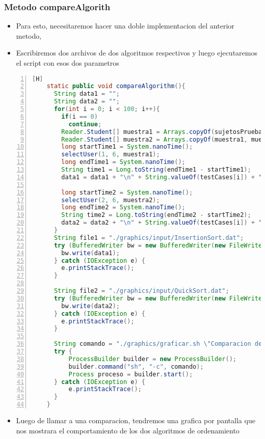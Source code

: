 \subsubsection{Metodo compareAlgorith}
\begin{itemize}
  \item Para esto, necesitaremos hacer una doble implementacion del anterior metodo,
  \item Escribiremos dos archivos de dos algoritmos respectivos y luego ejecutaremos el script con esos dos parametros

\end{itemize}
\begin{lstlisting}[language=java, caption={Testear algoritmo}, numbers=left, firstnumber=1][H]
    static public void compareAlgorithm(){
      String data1 = "";
      String data2 = "";
      for(int i = 0; i < 100; i++){
        if(i == 0)
          continue;
        Reader.Student[] muestra1 = Arrays.copyOf(sujetosPrueba, testCases[i]);
        Reader.Student[] muestra2 = Arrays.copyOf(muestra1, muestra1.length);
        long startTime1 = System.nanoTime();
        selectUser(1, 6, muestra1);
        long endTime1 = System.nanoTime();
        String time1 = Long.toString(endTime1 - startTime1);
        data1 = data1 + "\n" + String.valueOf(testCases[i]) + "\t" + time1;

        long startTime2 = System.nanoTime();
        selectUser(2, 6, muestra2);
        long endTime2 = System.nanoTime();
        String time2 = Long.toString(endTime2 - startTime2);
        data2 = data2 + "\n" + String.valueOf(testCases[i]) + "\t" + time2;
      }
      String file1 = "./graphics/input/InsertionSort.dat";
      try (BufferedWriter bw = new BufferedWriter(new FileWriter(file1))) {
        bw.write(data1);
      } catch (IOException e) {
        e.printStackTrace();
      }

      String file2 = "./graphics/input/QuickSort.dat";
      try (BufferedWriter bw = new BufferedWriter(new FileWriter(file2))) {
        bw.write(data2);
      } catch (IOException e) {
        e.printStackTrace();
      }

      String comando = "./graphics/graficar.sh \"Comparacion de algoritmos\" " + file1 + " " + file2;
      try {
          ProcessBuilder builder = new ProcessBuilder();
          builder.command("sh", "-c", comando);
          Process proceso = builder.start();
      } catch (IOException e) {
          e.printStackTrace();
      }
    }

\end{lstlisting}
\begin{itemize}
  \item Luego de llamar a una comparacion, tendremos una grafica por pantalla que nos mostrara el comportamiento de los dos algoritmos de ordenamiento
\end{itemize}

